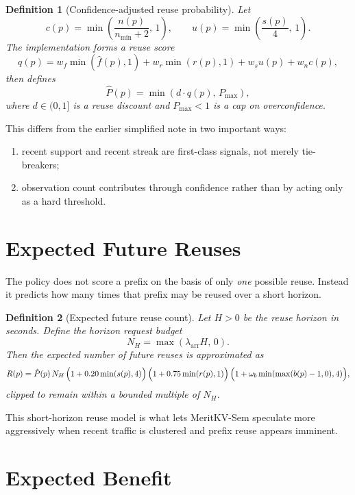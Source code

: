 \documentclass[11pt]{article}
\newtheorem{definition}{Definition}
\begin{document}
\begin{definition}[Confidence-adjusted reuse probability]
Let
\[
    c(p) = \min\!\left(\frac{n(p)}{n_{\min}+2},\, 1\right), \qquad
    u(p) = \min\!\left(\frac{s(p)}{4},\, 1\right).
\]
The implementation forms a reuse score
\[
    q(p) =
    w_f \min(\hat{f}(p),1)
    + w_r \min(r(p),1)
    + w_s u(p)
    + w_n c(p),
\]
then defines
\[
    \hat{P}(p) = \min\!\left(d \cdot q(p),\, P_{\max}\right),
\]
where $d \in (0,1]$ is a reuse discount and $P_{\max} < 1$ is a cap on
overconfidence.
\end{definition}

This differs from the earlier simplified note in two important ways:
\begin{enumerate}
    \item recent support and recent streak are first-class signals, not merely tie-breakers;
    \item observation count contributes through confidence rather than by acting only
    as a hard threshold.
\end{enumerate}

\section{Expected Future Reuses}

The policy does not score a prefix on the basis of only \emph{one} possible reuse.
Instead it predicts how many times that prefix may be reused over a short horizon.

\begin{definition}[Expected future reuse count]
Let $H > 0$ be the reuse horizon in seconds. Define the horizon request budget
\[
    N_H = \max(\lambda_{\mathrm{arr}} H,\, 0).
\]
Then the expected number of future reuses is approximated as
\[
    R(p) =
    \hat{P}(p)\, N_H\,
    \Bigl(1 + 0.20\min(s(p),4)\Bigr)\,
    \Bigl(1 + 0.75\min(r(p),1)\Bigr)\,
    \Bigl(1 + \omega_b \min(\max(b(p)-1,0),4)\Bigr),
\]
clipped to remain within a bounded multiple of $N_H$.
\end{definition}

This short-horizon reuse model is what lets MeritKV-Sem speculate more aggressively
when recent traffic is clustered and prefix reuse appears imminent.

\section{Expected Benefit}
\end{document}
